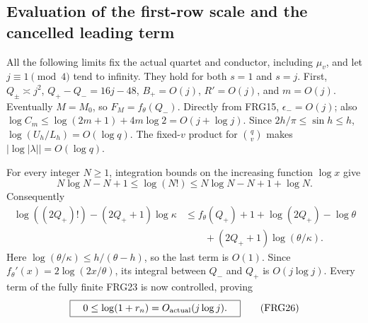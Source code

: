 \documentclass[11pt,a4paper]{article}
\begin{document}
\subsection{Evaluation of the first-row scale and the cancelled leading term}
All the following limits fix the actual quartet and conductor, including
$\mu_v$, and let $j\equiv1\pmod4$ tend to infinity. They hold for both
$s=1$ and $s=j$. First, $Q_\pm\asymp j^2$, $Q_+-Q_-=16j-48$,
$B_+=O(j)$, $R'=O(j)$, and $m=O(j)$. Eventually $M=M_0$,
so $F_M=f_\theta(Q_-)$. Directly from FRG15,
$\epsilon_-=O(j)$; also
$\log C_m\le\log(2m+1)+4m\log2=O(j+\log j)$.
Since $2h/\pi\le\sin h\le h$, $\log(U_h/L_h)=O(\log q)$.
The fixed-$v$ product for $\binom qv$ makes
$|\log|\lambda||=O(\log q)$.

For every integer $N\ge1$, integration bounds on the increasing
function $\log x$ give
\[
N\log N-N+1\le\log(N!)\le N\log N-N+1+\log N.
\tag{FRG24}
\]
Consequently
\[
\begin{split}
\log((2Q_+)!) -(2Q_++1)\log\kappa
&\le f_\theta(Q_+)+1+\log(2Q_+)-\log\theta\\
&\qquad +(2Q_++1)\log(\theta/\kappa).
\end{split}\tag{FRG25}
\]
Here $\log(\theta/\kappa)\le h/(\theta-h)$, so the last term is
$O(1)$. Since $f_\theta'(x)=2\log(2x/\theta)$, its integral between
$Q_-$ and $Q_+$ is $O(j\log j)$. Every term of the fully finite
FRG23 is now controlled, proving
\[
\boxed{\quad 0\le\log(1+r_n)=O_{\rm actual}(j\log j).\quad}
\tag{FRG26}
\]
\end{document}
